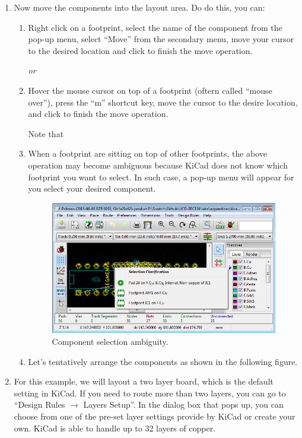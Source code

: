 \documentclass[12pt,letterpaper]{scrartcl}
\begin{document}
\begin{enumerate}
	\item Now move the components into the layout area. Do do this, you can:
		\begin{enumerate}
			\item Right click on a footprint, select the name of the component from the pop-up menu, select ``Move'' from the secondary menu, move your cursor to the desired location and click to finish the move operation. 
			
			\textit{or} 
			
			\item Hover the mouse cursor on top of a footprint (oftern called ``mouse over''), press the ``m'' shortcut key, move the cursor to the desire location, and click to finish the move operation.
			
			Note that 
			
			\item When a footprint are sitting on top of other footprints, the above operation may become ambiguous because KiCad does not know which footprint you want to select. In such case, a pop-up menu will appear for you select your desired component. 
				\begin{figure}[h]
					\centering
					\includegraphics[width=4in]{ambiguity}
					\caption{Component selection ambiguity.}
					\label{fig:ambiguity}
				\end{figure}
			
			\item Let’s tentatively arrange the components as shown in the following figure. 
				
		\end{enumerate}
		
	\item For this example, we will layout a two layer board, which is the default setting in KiCad. If you need to route more than two layers, you can go to ``Design Rules $\rightarrow$ Layers Setup''. In the dialog box that pops up, you can choose from one of the pre-set layer settings provide by KiCad or create your own. KiCad is able to handle up to 32 layers of copper. 


\end{enumerate}
\end{document}

